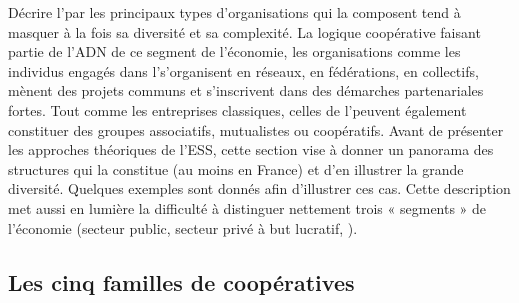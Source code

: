     Décrire l’\ess par les principaux types d’organisations qui la composent tend à masquer à la fois sa diversité et sa complexité. La logique coopérative faisant partie de l’ADN de ce segment de l’économie, les organisations comme les individus engagés dans l’\ess s’organisent en réseaux, en fédérations, en collectifs, mènent des projets communs et s’inscrivent dans des démarches partenariales fortes. Tout comme les entreprises classiques, celles de l’\ess peuvent également constituer des groupes associatifs, mutualistes ou coopératifs.
    Avant de présenter les approches théoriques de l'ESS, cette section vise à donner un panorama des structures qui la constitue (au moins en France) et d'en illustrer la grande diversité. Quelques exemples sont donnés afin d’illustrer ces cas. Cette description met aussi en lumière la difficulté à distinguer nettement trois « segments » de l’économie (secteur public, secteur privé à but lucratif, \ess).


    \subsection{Les cinq familles de coopératives}


